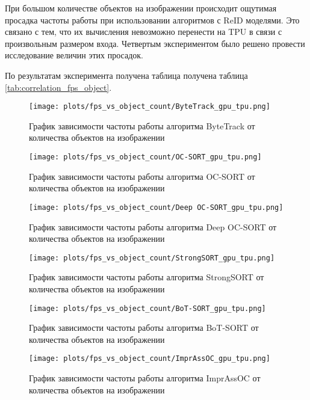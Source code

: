 При большом количестве объектов на изображении происходит ощутимая просадка частоты работы при использовании алгоритмов с ReID моделями. 
Это связано с тем, что их вычисления невозможно перенести на TPU в связи с произвольным размером входа.  
Четвертым экспериментом было решено провести исследование величин этих просадок. 

По результатам эксперимента получена таблица получена таблица \ref{tab:correlation_fps_object}. 


\begin{figure}[ht]
    \centering
    \texttt{[image: plots/fps\_vs\_object\_count/ByteTrack\_gpu\_tpu.png]}
    \caption{График зависимости частоты работы алгоритма ByteTrack от количества объектов на изображении}
    \label{fig:fps_object_ByteTrack}
\end{figure}

\begin{figure}[ht]
    \centering
    \texttt{[image: plots/fps\_vs\_object\_count/OC-SORT\_gpu\_tpu.png]}
    \caption{График зависимости частоты работы алгоритма OC-SORT от количества объектов на изображении}
    \label{fig:fps_object_OC-SORT}
\end{figure}

\begin{figure}[ht]
    \centering
    \texttt{[image: plots/fps\_vs\_object\_count/Deep OC-SORT\_gpu\_tpu.png]}
    \caption{График зависимости частоты работы алгоритма Deep OC-SORT от количества объектов на изображении}
    \label{fig:fps_object_Deep OC-SORT}
\end{figure}

\begin{figure}[ht]
    \centering
    \texttt{[image: plots/fps\_vs\_object\_count/StrongSORT\_gpu\_tpu.png]}
    \caption{График зависимости частоты работы алгоритма StrongSORT от количества объектов на изображении}
    \label{fig:fps_object_StrongSORT}
\end{figure}

\begin{figure}[ht]
    \centering
    \texttt{[image: plots/fps\_vs\_object\_count/BoT-SORT\_gpu\_tpu.png]}
    \caption{График зависимости частоты работы алгоритма BoT-SORT от количества объектов на изображении}
    \label{fig:fps_object_BoT-SORT}
\end{figure}

\begin{figure}[ht]
    \centering
    \texttt{[image: plots/fps\_vs\_object\_count/ImprAssOC\_gpu\_tpu.png]}
    \caption{График зависимости частоты работы алгоритма ImprAssOC от количества объектов на изображении}
    \label{fig:fps_object_ImprAssOC}
\end{figure}
\FloatBarrier